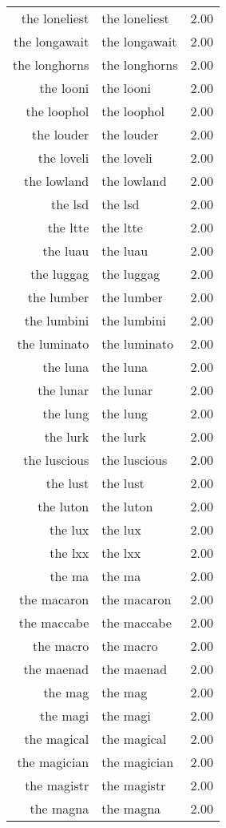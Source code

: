\begin{table}[ht]
\begin{tabular}{rlr}
  the loneliest & the loneliest & 2.00 \\ 
  the longawait & the longawait & 2.00 \\ 
  the longhorns & the longhorns & 2.00 \\ 
  the looni & the looni & 2.00 \\ 
  the loophol & the loophol & 2.00 \\ 
  the louder & the louder & 2.00 \\ 
  the loveli & the loveli & 2.00 \\ 
  the lowland & the lowland & 2.00 \\ 
  the lsd & the lsd & 2.00 \\ 
  the ltte & the ltte & 2.00 \\ 
  the luau & the luau & 2.00 \\ 
  the luggag & the luggag & 2.00 \\ 
  the lumber & the lumber & 2.00 \\ 
  the lumbini & the lumbini & 2.00 \\ 
  the luminato & the luminato & 2.00 \\ 
  the luna & the luna & 2.00 \\ 
  the lunar & the lunar & 2.00 \\ 
  the lung & the lung & 2.00 \\ 
  the lurk & the lurk & 2.00 \\ 
  the luscious & the luscious & 2.00 \\ 
  the lust & the lust & 2.00 \\ 
  the luton & the luton & 2.00 \\ 
  the lux & the lux & 2.00 \\ 
  the lxx & the lxx & 2.00 \\ 
  the ma & the ma & 2.00 \\ 
  the macaron & the macaron & 2.00 \\ 
  the maccabe & the maccabe & 2.00 \\ 
  the macro & the macro & 2.00 \\ 
  the maenad & the maenad & 2.00 \\ 
  the mag & the mag & 2.00 \\ 
  the magi & the magi & 2.00 \\ 
  the magical & the magical & 2.00 \\ 
  the magician & the magician & 2.00 \\ 
  the magistr & the magistr & 2.00 \\ 
  the magna & the magna & 2.00 \\ 

\end{tabular}
\end{table}
